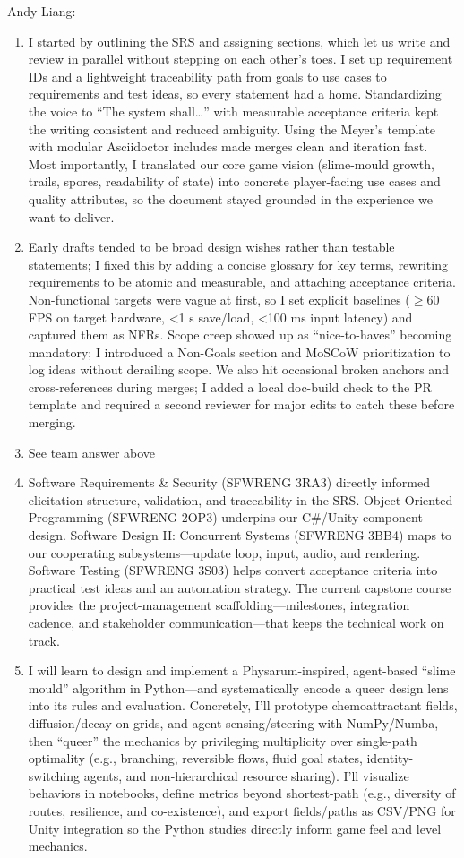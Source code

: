 \documentclass{article}
\begin{document}
Andy Liang:
\begin{enumerate}
\item I started by outlining the SRS and assigning sections, which let us write and review in parallel without stepping on each other’s toes. I set up requirement IDs and a lightweight traceability path from goals to use cases to requirements and test ideas, so every statement had a home. Standardizing the voice to “The system shall…” with measurable acceptance criteria kept the writing consistent and reduced ambiguity. Using the Meyer’s template with modular Asciidoctor includes made merges clean and iteration fast. Most importantly, I translated our core game vision (slime-mould growth, trails, spores, readability of state) into concrete player-facing use cases and quality attributes, so the document stayed grounded in the experience we want to deliver.
\item Early drafts tended to be broad design wishes rather than testable statements; I fixed this by adding a concise glossary for key terms, rewriting requirements to be atomic and measurable, and attaching acceptance criteria. Non-functional targets were vague at first, so I set explicit baselines ($\geq$60 FPS on target hardware, <1 s save/load, <100 ms input latency) and captured them as NFRs. Scope creep showed up as “nice-to-haves” becoming mandatory; I introduced a Non-Goals section and MoSCoW prioritization to log ideas without derailing scope. We also hit occasional broken anchors and cross-references during merges; I added a local doc-build check to the PR template and required a second reviewer for major edits to catch these before merging.
\item See team answer above
\item Software Requirements \& Security (SFWRENG 3RA3) directly informed elicitation structure, validation, and traceability in the SRS. Object-Oriented Programming (SFWRENG 2OP3) underpins our C\#/Unity component design. Software Design II: Concurrent Systems (SFWRENG 3BB4) maps to our cooperating subsystems—update loop, input, audio, and rendering. Software Testing (SFWRENG 3S03) helps convert acceptance criteria into practical test ideas and an automation strategy. The current capstone course provides the project-management scaffolding—milestones, integration cadence, and stakeholder communication—that keeps the technical work on track.
\item I will learn to design and implement a Physarum-inspired, agent-based “slime mould” algorithm in Python—and systematically encode a queer design lens into its rules and evaluation. Concretely, I’ll prototype chemoattractant fields, diffusion/decay on grids, and agent sensing/steering with NumPy/Numba, then “queer” the mechanics by privileging multiplicity over single-path optimality (e.g., branching, reversible flows, fluid goal states, identity-switching agents, and non-hierarchical resource sharing). I’ll visualize behaviors in notebooks, define metrics beyond shortest-path (e.g., diversity of routes, resilience, and co-existence), and export fields/paths as CSV/PNG for Unity integration so the Python studies directly inform game feel and level mechanics.

\end{enumerate}
\end{document}
